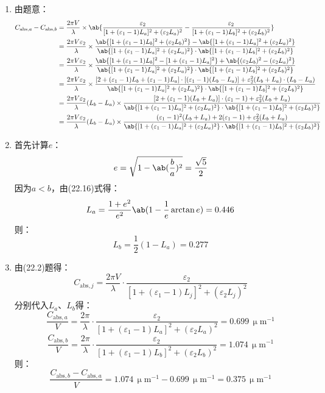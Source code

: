 \documentclass[a4paper,fontset=none]{ctexart}
\newcommand{\um}{\upmu\mathrm{m}}
\renewcommand\epsilon{\varepsilon}
\begin{document}
\begin{enumerate}
    \medskip
    \item[22.2 (b)]
    由题意：
    \begin{align*}
        C_{\mathrm{abs},a} - C_{\mathrm{abs},b}
        &= \frac{2\pi V}{\lambda} \times \ab\{\frac{\epsilon_2}{[1 + (\epsilon_1 - 1)L_a]^2 + (\epsilon_2 L_a)^2} - \frac{\epsilon_2}{[1 + (\epsilon_1 - 1)L_b]^2 + (\epsilon_2 L_b)^2}\} \\
        &= \frac{2\pi V\epsilon_2}{\lambda} \times \frac{\ab\{[1 + (\epsilon_1 - 1)L_b]^2 + (\epsilon_2 L_b)^2\} - \ab\{[1 + (\epsilon_1 - 1)L_a]^2 + (\epsilon_2 L_a)^2\}}{\ab\{[1 + (\epsilon_1 - 1)L_a]^2 + (\epsilon_2 L_a)^2\} \cdot \ab\{[1 + (\epsilon_1 - 1)L_b]^2 + (\epsilon_2 L_b)^2\}} \\
        &= \frac{2\pi V\epsilon_2}{\lambda} \times \frac{\ab\{[1 + (\epsilon_1 - 1)L_b]^2 - [1 + (\epsilon_1 - 1)L_a]^2\} + \ab\{(\epsilon_2 L_b)^2 - (\epsilon_2 L_a)^2\}}{\ab\{[1 + (\epsilon_1 - 1)L_a]^2 + (\epsilon_2 L_a)^2\} \cdot \ab\{[1 + (\epsilon_1 - 1)L_b]^2 + (\epsilon_2 L_b)^2\}} \\
        &= \frac{2\pi V\epsilon_2}{\lambda} \times \frac{[2 + (\epsilon_1 - 1)L_b + (\epsilon_1 - 1)L_a] \cdot [(\epsilon_1 - 1)(L_b - L_a)] + \epsilon_2^2 (L_b + L_a) \cdot (L_b - L_a)}{\ab\{[1 + (\epsilon_1 - 1)L_a]^2 + (\epsilon_2 L_a)^2\} \cdot \ab\{[1 + (\epsilon_1 - 1)L_b]^2 + (\epsilon_2 L_b)^2\}} \\
        &= \frac{2\pi V\epsilon_2}{\lambda} (L_b - L_a) \times \frac{[2 + (\epsilon_1 - 1) (L_b + L_a)] \cdot (\epsilon_1 - 1) + \epsilon_2^2 (L_b + L_a)}{\ab\{[1 + (\epsilon_1 - 1)L_a]^2 + (\epsilon_2 L_a)^2\} \cdot \ab\{[1 + (\epsilon_1 - 1)L_b]^2 + (\epsilon_2 L_b)^2\}} \\
        &= \frac{2\pi V\epsilon_2}{\lambda} (L_b - L_a) \times \frac{(\epsilon_1 - 1)^2 (L_b + L_a) + 2(\epsilon_1 - 1) + \epsilon_2^2 (L_b + L_a)}{\ab\{[1 + (\epsilon_1 - 1)L_a]^2 + (\epsilon_2 L_a)^2\} \cdot \ab\{[1 + (\epsilon_1 - 1)L_b]^2 + (\epsilon_2 L_b)^2\}}
    \end{align*}

    \bigskip
    \item[22.3 (a)]
    首先计算$e$：
    \[
        e = \sqrt{1 - \ab(\frac{b}{a})^2} = \frac{\sqrt{5}}{2}
    \]
    因为$a < b$，由(22.16)式得：
    \[
        L_a = \frac{1+e^2}{e^2} \ab(1 - \frac{1}{e}\arctan{e}) = 0.446
    \]
    则：
    \[
        L_b = \frac{1}{2}(1 - L_a) = 0.277
    \]

    \medskip
    \item[22.3 (b)]
    由(22.2)题得：
    \[
        C_{\mathrm{abs},j} = \frac{2\pi V}{\lambda} \cdot \frac{\epsilon_2}{[1 + (\epsilon_1 - 1)L_j]^2 + (\epsilon_2 L_j)^2}
    \]
    分别代入$L_a$、$L_b$得：
    \[
        \frac{C_{\mathrm{abs},a}}{V} = \frac{2\pi}{\lambda} \cdot \frac{\epsilon_2}{[1 + (\epsilon_1 - 1)L_a]^2 + (\epsilon_2 L_a)^2} = 0.699\,\um^{-1}
    \]
    \[
        \frac{C_{\mathrm{abs},b}}{V} = \frac{2\pi}{\lambda} \cdot \frac{\epsilon_2}{[1 + (\epsilon_1 - 1)L_b]^2 + (\epsilon_2 L_b)^2} = 1.074\,\um^{-1}
    \]
    则：
    \[
        \frac{C_{\mathrm{abs},b} - C_{\mathrm{abs},a}}{V} = 1.074\,\um^{-1} - 0.699\,\um^{-1} = 0.375\,\um^{-1}
    \]


\end{enumerate}
\end{document}
